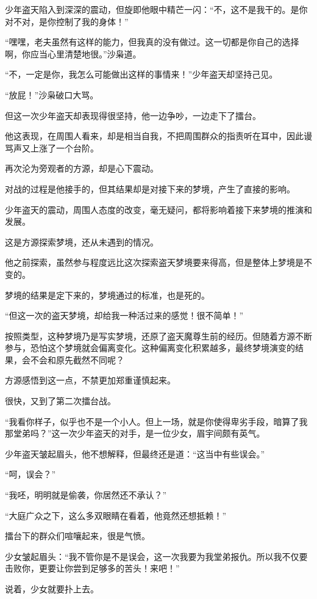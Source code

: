 \begin{this_body}
少年盗天陷入到深深的震动，但旋即他眼中精芒一闪：“不，这不是我干的。是你对不对，是你控制了我的身体！”

“嘿嘿，老夫虽然有这样的能力，但我真的没有做过。这一切都是你自己的选择啊，你应当心里清楚地很。”沙枭道。

“不，一定是你，我怎么可能做出这样的事情来！”少年盗天却坚持己见。

“放屁！”沙枭破口大骂。

但这一次少年盗天却表现得很坚持，他一边争吵，一边走下了擂台。

他这表现，在周围人看来，却是相当自我，不把周围群众的指责听在耳中，因此谩骂声又上涨了一个台阶。

再次沦为旁观者的方源，却是心下震动。

对战的过程是他接手的，但其结果却是对接下来的梦境，产生了直接的影响。

少年盗天的震动，周围人态度的改变，毫无疑问，都将影响着接下来梦境的推演和发展。

这是方源探索梦境，还从未遇到的情况。

他之前探索，虽然参与程度远比这次探索盗天梦境要来得高，但是整体上梦境是不变的。

梦境的结果是定下来的，梦境通过的标准，也是死的。

“但这一次的盗天梦境，却给我一种活过来的感觉！很不简单！”

按照类型，这种梦境乃是写实梦境，还原了盗天魔尊生前的经历。但随着方源不断参与，恐怕这个梦境就会偏离变化。这种偏离变化积累越多，最终梦境演变的结果，会不会和原先截然不同呢？

方源感悟到这一点，不禁更加郑重谨慎起来。

很快，又到了第二次擂台战。

“我看你样子，似乎也不是一个小人。但上一场，就是你使得卑劣手段，暗算了我那堂弟吗？”这一次少年盗天的对手，是一位少女，眉宇间颇有英气。

少年盗天皱起眉头，他不想解释，但最终还是道：“这当中有些误会。”

“呵，误会？”

“我呸，明明就是偷袭，你居然还不承认？”

“大庭广众之下，这么多双眼睛在看着，他竟然还想抵赖！”

擂台下的群众们喧嚷起来，很是气愤。

少女皱起眉头：“我不管你是不是误会，这一次我要为我堂弟报仇。所以我不仅要击败你，更要让你尝到足够多的苦头！来吧！”

说着，少女就要扑上去。


\end{this_body}
